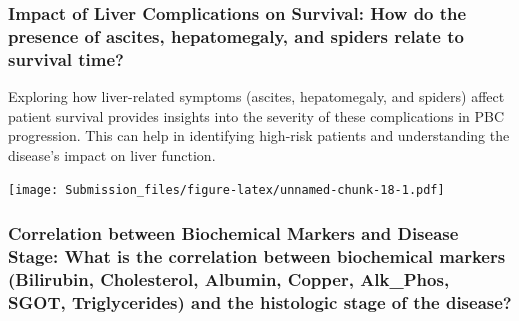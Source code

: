 \documentclass[
]{article}
\newenvironment{Shaded}{\begin{snugshade}}{\end{snugshade}}
\newcommand{\AttributeTok}[1]{\textcolor[rgb]{0.13,0.29,0.53}{#1}}
\newcommand{\CommentTok}[1]{\textcolor[rgb]{0.56,0.35,0.01}{\textit{#1}}}
\newcommand{\ConstantTok}[1]{\textcolor[rgb]{0.56,0.35,0.01}{#1}}
\newcommand{\FunctionTok}[1]{\textcolor[rgb]{0.13,0.29,0.53}{\textbf{#1}}}
\newcommand{\NormalTok}[1]{#1}
\newcommand{\OtherTok}[1]{\textcolor[rgb]{0.56,0.35,0.01}{#1}}
\newcommand{\SpecialCharTok}[1]{\textcolor[rgb]{0.81,0.36,0.00}{\textbf{#1}}}
\newcommand{\StringTok}[1]{\textcolor[rgb]{0.31,0.60,0.02}{#1}}
\begin{document}
\hypertarget{impact-of-liver-complications-on-survival-how-do-the-presence-of-ascites-hepatomegaly-and-spiders-relate-to-survival-time}{%
\subsubsection{Impact of Liver Complications on Survival: How do the
presence of ascites, hepatomegaly, and spiders relate to survival
time?}\label{impact-of-liver-complications-on-survival-how-do-the-presence-of-ascites-hepatomegaly-and-spiders-relate-to-survival-time}}

Exploring how liver-related symptoms (ascites, hepatomegaly, and
spiders) affect patient survival provides insights into the severity of
these complications in PBC progression. This can help in identifying
high-risk patients and understanding the disease's impact on liver
function.

\begin{Shaded}
\end{Shaded}

\texttt{[image: Submission\_files/figure-latex/unnamed-chunk-18-1.pdf]}

\hypertarget{correlation-between-biochemical-markers-and-disease-stage-what-is-the-correlation-between-biochemical-markers-bilirubin-cholesterol-albumin-copper-alk_phos-sgot-triglycerides-and-the-histologic-stage-of-the-disease}{%
\subsubsection{Correlation between Biochemical Markers and Disease
Stage: What is the correlation between biochemical markers (Bilirubin,
Cholesterol, Albumin, Copper, Alk\_Phos, SGOT, Triglycerides) and the
histologic stage of the
disease?}\label{correlation-between-biochemical-markers-and-disease-stage-what-is-the-correlation-between-biochemical-markers-bilirubin-cholesterol-albumin-copper-alk_phos-sgot-triglycerides-and-the-histologic-stage-of-the-disease}}
\end{document}
